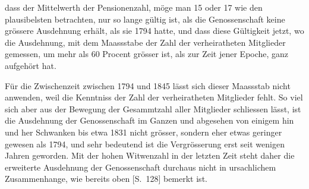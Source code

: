 \documentclass[12pt,a4paper]{article}
\begin{document}
dass der Mittelwerth der Pensionenzahl, m\"oge man 15 oder 17 wie den plausibelsten betrachten, nur so lange g\"ultig ist, als die Genossenschaft keine gr\"ossere Ausdehnung erh\"alt, als sie 1794 hatte, und dass diese G\"ultigkeit jetzt, wo die Ausdehnung, mit dem Maassstabe der Zahl der verheiratheten Mitglieder gemessen, um mehr als 60 Procent gr\"osser ist, als zur Zeit jener Epoche, ganz aufgeh\"ort hat.

F\"ur die Zwischenzeit zwischen 1794 und 1845 l\"asst sich dieser Maassstab nicht anwenden, weil die Kenntniss der Zahl der verheiratheten Mitglieder fehlt. So viel sich aber aus der Bewegung der Gesammtzahl aller Mitglieder schliessen l\"asst, ist die Ausdehnung der Genossenschaft im Ganzen und abgesehen von einigem hin und her Schwanken bis etwa 1831 nicht gr\"osser, sondern eher etwas geringer gewesen als 1794, und sehr bedeutend ist die Vergr\"osserung erst seit wenigen Jahren geworden. Mit der hohen Witwenzahl in der letzten Zeit steht daher die erweiterte Ausdehnung der Genossenschaft durchaus nicht in ursachlichem Zusammenhange, wie bereits oben [S.\ 128] bemerkt ist.
\end{document}
